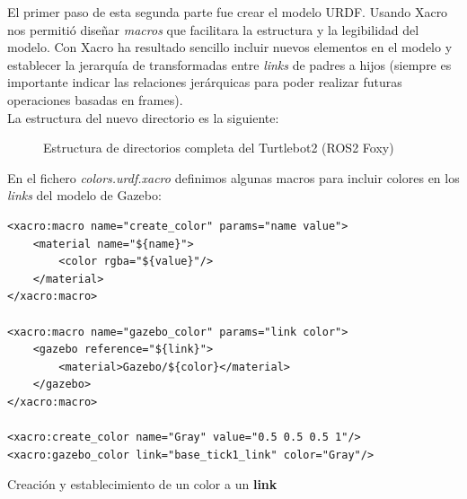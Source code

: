 El primer paso de esta segunda parte fue crear el modelo URDF. Usando Xacro nos permitió diseñar \textit{macros} que facilitara la estructura y la legibilidad del modelo. Con Xacro ha resultado sencillo incluir nuevos elementos en el modelo y establecer la jerarquía de transformadas entre \textit{links} de padres a hijos (siempre es importante indicar las relaciones jerárquicas para poder realizar futuras operaciones basadas en frames).\\

La estructura del nuevo directorio es la siguiente:
\begin{figure}[H]
	\begin{center}
	    \setlength{\fboxsep}{0.5cm}
	    \caption{Estructura de directorios completa del Turtlebot2 (ROS2 Foxy)}
	    \label{fig:directorios_turtlebot2}
	\end{center}
\end{figure}

En el fichero \textit{colors.urdf.xacro} definimos algunas macros para incluir colores en los \textit{links} del modelo de Gazebo:\\
\begin{code}[H]
\begin{lstlisting}
<xacro:macro name="create_color" params="name value">
	<material name="${name}">
		<color rgba="${value}"/>
	</material>
</xacro:macro>

<xacro:macro name="gazebo_color" params="link color">
	<gazebo reference="${link}">
		<material>Gazebo/${color}</material>
	</gazebo>
</xacro:macro>

<xacro:create_color name="Gray" value="0.5 0.5 0.5 1"/>
<xacro:gazebo_color link="base_tick1_link" color="Gray"/>
\end{lstlisting}
\caption{Creación y establecimiento de un color a un \textbf{link}}
\label{fig:creacion_color_link}
\end{code}\

